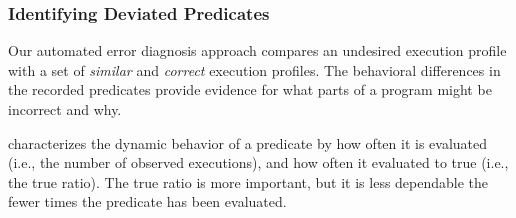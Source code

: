 



\subsubsection{Identifying Deviated Predicates}
\label{sec:deviation}
Our
automated error diagnosis approach compares an undesired execution profile with a set
of \textit{similar} and \textit{correct} execution profiles. 
The behavioral differences in the recorded predicates provide evidence for what parts of a program might be
incorrect and why. %

\ourtool 
characterizes the dynamic behavior of a predicate by 
how often it is
evaluated (i.e., the number of 
observed executions), and how often it evaluated to true (i.e., the true ratio).
The true ratio is more important, but it is less dependable the fewer times
the predicate has been evaluated.

